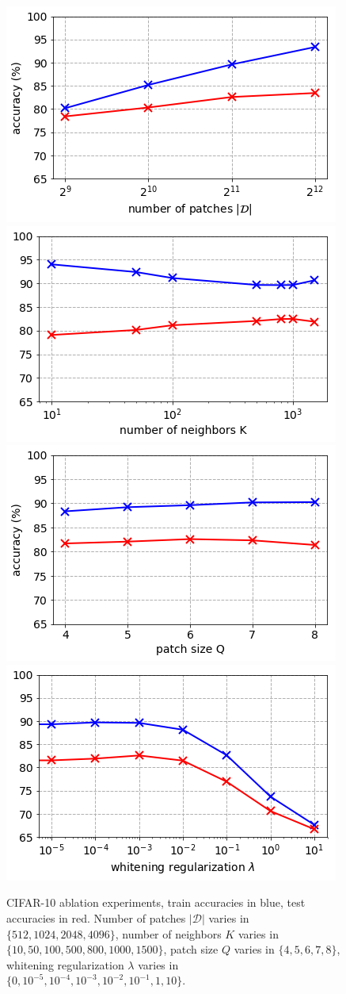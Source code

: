 \documentclass{article}
\begin{document}
\begin{figure}[h!]
  \centering
   \includegraphics[width=0.49\linewidth]{figures/ablation_npatches_large.png}
  \includegraphics[width=0.49\linewidth]{figures/ablation_K_large.png}
  \includegraphics[width=0.49\linewidth]{figures/ablation_Q_large.png}
  \includegraphics[width=0.49\linewidth]{figures/ablation_lambda_large.png}\\
    \caption{CIFAR-10 ablation experiments, train accuracies in blue, test accuracies in red.
    Number of patches $|\mathcal{D}|$ varies in $\lbrace 512, 1024, 2048, 4096  \rbrace$, number of neighbors $K$ varies in $\lbrace 10, 50, 100, 500, 800, 1000, 1500\rbrace$, patch size $Q$ varies in $\lbrace 4,5,6,7,8 \rbrace$, whitening regularization $\lambda$ varies in $\lbrace0, 10^{-5}, 10^{-4}, 10^{-3}, 10^{-2}, 10^{-1}, 1, 10 \rbrace$. }
    \label{fig:ablation_study_highres}
\end{figure}
\end{document}
